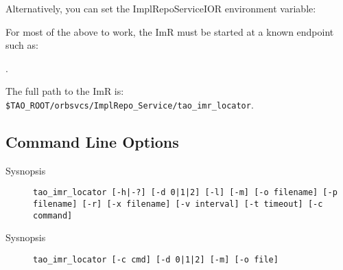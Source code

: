 Alternatively, you can set the ImplRepoServiceIOR environment variable:


For most of the above to work, the ImR must be started at a known endpoint such as:

.

The full path to the ImR is: {\tt \$TAO\_ROOT/orbsvcs/ImplRepo\_Service/tao\_imr\_locator}.

\subsection{Command Line Options}

\begin{description}
\item[Sysnopsis] {\tt tao\_imr\_locator [-h|-?] [-d 0|1|2] [-l] [-m] [-o filename] [-p filename] [-r]  [-x filename]
[-v interval] [-t timeout] [-c command]}
\item[Sysnopsis] {\tt tao\_imr\_locator [-c cmd] [-d 0|1|2] [-m] [-o file]}
\end{description}

